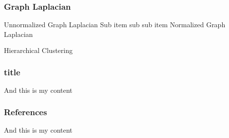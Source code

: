 \documentclass{beamer}
\begin{document}
\begin{frame}
\frametitle{Graph Laplacian}
\begin{outline}
 \1 Unnormalized Graph Laplacian
   \2 Sub item
     \3 sub sub item
 \1 Normalized Graph Laplacian
\end{outline}
\end{frame}


\begin{frame}
\begin{center}
  \textcolor{TennesseeOrange}{\huge Hierarchical Clustering}  
\end{center}
\end{frame}

\begin{frame}
\frametitle{title}
And this is my content
\end{frame}


\begin{frame}
\frametitle{References}
And this is my content
\end{frame}
\end{document}
